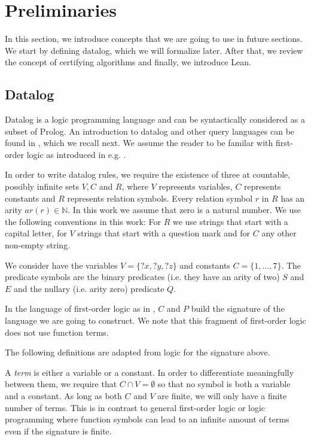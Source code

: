 \chapter{Preliminaries}\label{sec:prelim}


In this section, we introduce concepts that we are going to use in future sections. We start by defining datalog, which we will formalize later. After that, we review the concept of certifying algorithms and finally, we introduce Lean.


\section{Datalog}
Datalog is a logic programming language and can be syntactically considered as a subset of Prolog. An introduction to datalog and other query languages can be found in \cite{alice}, which we recall next. We assume the reader to be familar with first-order logic as introduced in e.g. \cite{logic}.

In order to write datalog rules, we require the existence of three at countable, possibly infinite sets $V, C$ and $R$, where $V$ represents variables, $C$ represents constants and $R$ represents relation symbols. Every relation symbol $r$ in $R$ has an arity $ar(r) \in \mathbb{N}$. In this work we assume that zero is a natural number.
We use the following conventions in this work: For $R$ we use strings that start with a capital letter, for $V$ strings that start with a question mark and for $C$ any other non-empty string.

\begin{example}\label{ex:basicSets}
We consider have the variables $V= \{?x,?y,?z\}$ and constants $C= \{1,...,7\}$. The predicate symbols are the binary predicates (i.e. they have an arity of two) $S$ and $E$ and the nullary (i.e. arity zero) predicate $Q$.
\end{example}

In the language of first-order logic as in \cite{logic}, $C$ and $P$ build the signature of the language we are going to construct. We note that this fragment of first-order logic does not use function terms.

The following definitions are adapted from logic for the signature above.

A \textit{term} is either a variable or a constant. In order to differentiate meaningfully between them, we require that $C \cap V = \emptyset$ so that no symbol is both a variable and a constant. As long as both $C$ and $V$ are finite, we will only have a finite number of terms. This is in contrast to general first-order logic or logic programming where function symbols can lead to an infinite amount of terms even if the signature is finite.

